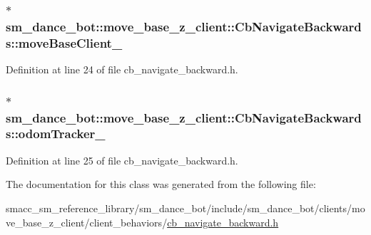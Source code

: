 \subsubsection[{\texorpdfstring{move\+Base\+Client\+\_\+}{moveBaseClient_}}]{$\ast$ sm\+\_\+dance\+\_\+bot\+::move\+\_\+base\+\_\+z\+\_\+client\+::\+Cb\+Navigate\+Backwards\+::move\+Base\+Client\+\_\+}\hypertarget{classsm__dance__bot_1_1move__base__z__client_1_1CbNavigateBackwards_a03ed133f7064857034dd7eadf0618674}{}\label{classsm__dance__bot_1_1move__base__z__client_1_1CbNavigateBackwards_a03ed133f7064857034dd7eadf0618674}


Definition at line 24 of file cb\+\_\+navigate\+\_\+backward.\+h.

\subsubsection[{\texorpdfstring{odom\+Tracker\+\_\+}{odomTracker_}}]{$\ast$ sm\+\_\+dance\+\_\+bot\+::move\+\_\+base\+\_\+z\+\_\+client\+::\+Cb\+Navigate\+Backwards\+::odom\+Tracker\+\_\+}\hypertarget{classsm__dance__bot_1_1move__base__z__client_1_1CbNavigateBackwards_acccdc0dd0d8810193f85a6bbbbe7effb}{}\label{classsm__dance__bot_1_1move__base__z__client_1_1CbNavigateBackwards_acccdc0dd0d8810193f85a6bbbbe7effb}


Definition at line 25 of file cb\+\_\+navigate\+\_\+backward.\+h.



The documentation for this class was generated from the following file\+:\begin{DoxyCompactItemize}
\item 
smacc\+\_\+sm\+\_\+reference\+\_\+library/sm\+\_\+dance\+\_\+bot/include/sm\+\_\+dance\+\_\+bot/clients/move\+\_\+base\+\_\+z\+\_\+client/client\+\_\+behaviors/\hyperlink{smacc__sm__reference__library_2sm__dance__bot_2include_2sm__dance__bot_2clients_2move__base__z__4f2aa30834ea1c7ed1eb80e835162070}{cb\+\_\+navigate\+\_\+backward.\+h}\end{DoxyCompactItemize}

